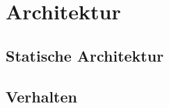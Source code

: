 \chapter{Architektur}
\label{cha:Architektur}

\section{Statische Architektur}

\section{Verhalten}
